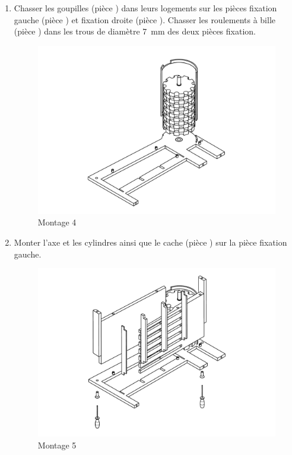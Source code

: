 \begin{enumerate}
\item Chasser les goupilles (pièce ) dans leurs logements sur les pièces fixation gauche (pièce ) et fixation droite (pièce ). Chasser les roulements à bille (pièce ) dans les trous de diamètre \SI{7}{\mm} des deux pièces fixation.

\newpage

\begin{figure}
    \centering
    \centerfloat
    \includegraphics[width=1.3\textwidth]{Graphics/Montage/4.pdf}
    \caption{Montage 4}
    \label{fig:Montage4}
\end{figure}

\item Monter l'axe et les cylindres ainsi que le cache (pièce ) sur la pièce fixation gauche.

\newpage

\begin{figure}
    \centering
    \centerfloat
    \includegraphics[width=1.3\textwidth]{Graphics/Montage/5.pdf}
    \caption{Montage 5}
    \label{fig:Montage5}
\end{figure}


\end{enumerate}
